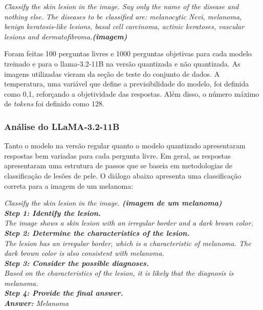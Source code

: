 \begin{dialogue}
     \textit{Classify the skin lesion in the image. Say only the name of the disease and nothing else.
    The diseases to
    be classified are: melanocytic Nevi,
    melanoma, benign keratosis-like lesions, basal cell carcinoma, actinic keratoses, vascular lesions and
    dermatofibroma.\textbf{(imagem)}}
\end{dialogue}

Foram feitas 100 perguntas livres e 1000 perguntas objetivas para cada modelo treinado e para o \ac{llama}-3.2-11B na
versão quantizada e não quantizada. As imagens utilizadas vieram da seção de teste do conjunto de dados. A
temperatura, uma variável que define a previsibilidade do modelo, foi definida como 0,1, reforçando a objetividade das
respostas. Além disso, o número máximo de \textit{tokens} foi definido como 128.

\subsubsection{Análise do LLaMA-3.2-11B}

Tanto o modelo na versão regular quanto o modelo quantizado apresentaram respostas bem variadas para cada pergunta
livre. Em geral, as respostas apresentaram uma estrutura de passos que se baseia em metodologias de classificação de
lesões de pele. O diálogo abaixo apresenta uma classificação correta para a imagem de um melanoma:

\begin{dialogue}
     \textit{Classify the skin lesion in the image. \textbf{(imagem de um melanoma)}} \\
     \textit{\textbf{Step 1: Identify the lesion.} \\
    The image shows a skin lesion with an irregular border and a dark brown color. \\
    \textbf{Step 2: Determine the characteristics of the lesion.} \\
    The lesion has an irregular border, which is a characteristic of melanoma. The dark brown color is also consistent
    with
    melanoma. \\
    \textbf{Step 3: Consider the possible diagnoses.} \\
    Based on the characteristics of the lesion, it is likely that the diagnosis is melanoma. \\
    \textbf{Step 4: Provide the final answer.} \\
    \textbf{Answer:} Melanoma}
\end{dialogue}

